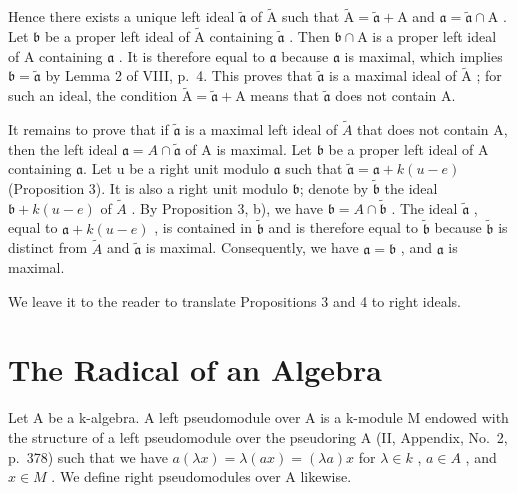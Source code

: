 Hence there exists a unique left ideal \(\widetilde{\mathfrak{a}}\) of \(\widetilde{\mathrm{A}}\) such that \(\widetilde{\mathrm{A}} = \widetilde{\mathfrak{a}} + \mathrm{A}\) and \(\mathfrak{a} = \widetilde{\mathfrak{a}} \cap \mathrm{A}\) . Let \(\mathfrak{b}\) be a proper left ideal of \(\widetilde{\mathrm{A}}\) containing \(\widetilde{\mathfrak{a}}\) . Then \(\mathfrak{b} \cap \mathrm{A}\) is a proper left ideal of \(\mathrm{A}\) containing \(\mathfrak{a}\) . It is therefore equal to \(\mathfrak{a}\) because \(\mathfrak{a}\) is maximal, which implies \(\mathfrak{b} = \widetilde{\mathfrak{a}}\) by Lemma 2 of VIII, p.~4. This proves that \(\widetilde{\mathfrak{a}}\) is a maximal ideal of \(\widetilde{\mathrm{A}}\) ; for such an ideal, the condition \(\widetilde{\mathrm{A}} = \widetilde{\mathfrak{a}} + \mathrm{A}\) means that \(\widetilde{\mathfrak{a}}\) does not contain A.

It remains to prove that if \(\widetilde{\mathfrak{a}}\) is a maximal left ideal of \(\tilde{A}\) that does not contain A, then the left ideal \(\mathfrak{a} = A \cap \widetilde{\mathfrak{a}}\) of A is maximal. Let \(\mathfrak{b}\) be a proper left ideal of A containing \(\mathfrak{a}\). Let u be a right unit modulo \(\mathfrak{a}\) such that \(\widetilde{\mathfrak{a}} = \mathfrak{a} + k(u - e)\) (Proposition 3). It is also a right unit modulo \(\mathfrak{b}\); denote by \(\widetilde{\mathfrak{b}}\) the ideal \(\mathfrak{b} + k(u - e)\) of \(\tilde{A}\) . By Proposition 3, b), we have \(\mathfrak{b} = A \cap \widetilde{\mathfrak{b}}\) . The ideal \(\widetilde{\mathfrak{a}}\) , equal to \(\mathfrak{a} + k(u - e)\) , is contained in \(\widetilde{\mathfrak{b}}\) and is therefore equal to \(\widetilde{\mathfrak{b}}\) because \(\widetilde{\mathfrak{b}}\) is distinct from \(\tilde{A}\) and \(\widetilde{\mathfrak{a}}\) is maximal. Consequently, we have \(\mathfrak{a} = \mathfrak{b}\) , and \(\mathfrak{a}\) is maximal.

We leave it to the reader to translate Propositions 3 and 4 to right ideals.

\section{The Radical of an Algebra}

Let A be a k-algebra. A left pseudomodule over A is a k-module M endowed with the structure of a left pseudomodule over the pseudoring A (II, Appendix, No.~2, p.~378) such that we have \(a(\lambda x) = \lambda(ax) = (\lambda a)x\) for \(\lambda \in k\) , \(a \in A\) , and \(x \in M\) . We define right pseudomodules over A likewise.

